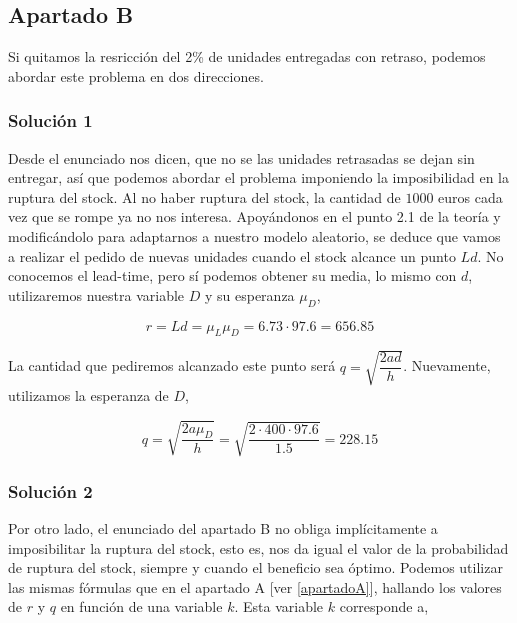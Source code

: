 \documentclass[a4paper,12pt]{article}
\begin{document}

\pagebreak

\subsection{Apartado B}

Si quitamos la resricci\'on del 2\% de unidades entregadas con retraso, podemos abordar este problema en dos direcciones.


\subsubsection{Soluci\'on 1}
Desde el enunciado nos dicen, que no se las unidades retrasadas se dejan sin entregar, as\'i que podemos abordar el problema imponiendo la imposibilidad en la ruptura del stock. Al no haber ruptura del stock, la cantidad de $1000$ euros cada vez que se rompe ya no nos interesa. Apoy\'andonos en el punto 2.1 de la teor\'ia y modific\'andolo para adaptarnos a nuestro modelo aleatorio, se deduce que vamos a realizar el pedido de nuevas unidades cuando el stock alcance un punto $Ld$. No conocemos el lead-time, pero s\'i podemos obtener su media, lo mismo con $d$, utilizaremos nuestra variable $D$ y su esperanza $\mu_D$,

$$ r = Ld = \mu_L \mu_D = 6.73 \cdot 97.6 = 656.85$$

La cantidad que pediremos alcanzado este punto ser\'a $q = \sqrt{\dfrac{2ad}{h}}$. Nuevamente, utilizamos la esperanza de $D$,

$$ q = \sqrt{\dfrac{2a\mu_D}{h}} = \sqrt{\dfrac{2\cdot 400\cdot 97.6}{1.5}} = 228.15$$

\subsubsection{Soluci\'on 2}
Por otro lado, el enunciado del apartado B no obliga impl\'icitamente a imposibilitar la ruptura del stock, esto es, nos da igual el valor de la probabilidad de ruptura del stock, siempre y cuando el beneficio sea \'optimo. Podemos utilizar las mismas f\'ormulas que en el apartado A [ver \ref{apartadoA}], hallando los valores de $r$ y $q$ en funci\'on de una variable $k$. Esta variable $k$ corresponde a,
\end{document}
